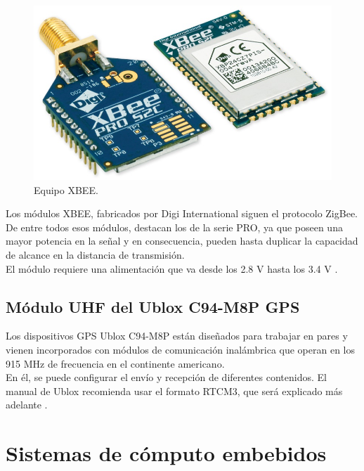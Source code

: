 \begin{figure}[ht]
\centering
\includegraphics[scale=0.60]{Figures/xbee}
\caption[Equipo XBEE.]{Equipo XBEE\footnotemark.}
\label{fig:XBEE}
\end{figure}


Los módulos XBEE, fabricados por Digi International siguen el protocolo ZigBee. De entre todos esos módulos, destacan los de la serie PRO, ya que poseen una mayor potencia en la señal y en consecuencia, pueden hasta duplicar la capacidad de alcance en la distancia de transmisión. \\

El módulo requiere una alimentación que va desde los 2.8 V hasta los 3.4 V \citep{oyarce2010guia}.

\subsection{Módulo UHF del Ublox C94-M8P GPS}

Los dispositivos GPS Ublox C94-M8P están diseñados para trabajar en pares y vienen incorporados con módulos de comunicación inalámbrica que operan en los 915 MHz de frecuencia en el continente americano. \\

En él, se puede configurar el envío y recepción de diferentes contenidos. El manual de Ublox recomienda usar el formato RTCM3, que será explicado más adelante \citep{ubloxc94}.

\section{Sistemas de cómputo embebidos}

